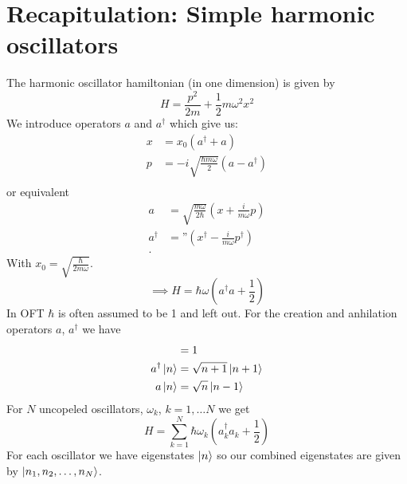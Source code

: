 \documentclass{report}
\begin{document}
\chapter{Recapitulation: Simple harmonic oscillators}
The harmonic oscillator hamiltonian (in one dimension) is given by \[
H = \frac{p^2}{2m} +\frac{1}{2}m \omega^2 x^2
\] We introduce operators $a$ and $a^\dagger$ which give us:
 \begin{align*}
	 x &= x_0\left( a^\dagger + a \right) \\
	 p &=  -i \sqrt{\frac{\hbar m \omega}{2}} \left( a - a^\dagger \right)  \\
\end{align*}
or equivalent
\begin{align*}
	a &= \sqrt{\frac{m \omega}{2 \hbar }}  \left( x + \frac{i}{m \omega} p \right) \\
	a^\dagger &= \text{''} \left( x^\dagger - \frac{i}{m \omega} p^\dagger \right)  \\
.\end{align*}
With $x_0 = \sqrt{\frac{\hbar}{2m \omega}} $. \[
\implies H = \hbar \omega \left( a^\dagger a + \frac{1}{2} \right) 
\] In OFT $\hbar$ is often assumed to be 1 and left out. For the creation and anhilation operators $a$, $a^\dagger$ we have
\begin{align*}
	[a,a^\dagger] &= 1 \\
	a^\dagger \ket{n} &= \sqrt{n+1} \ket{n+1} \\
	a \ket{n} &= \sqrt{n} \ket{n-1} \\
\end{align*} For $N$ uncopeled oscillators, $\omega_k$, $k = 1, \ldots N$ we get \[
H = \sum_{k=1}^{N} \hbar \omega_k\left( a_k^\dagger a_k + \frac{1}{2} \right) 
\] For each oscillator we have eigenstates $\ket{n}$ so our combined eigenstates are given by $\ket{n_1,n_2,\ldots,n_N}$.
\end{document}
